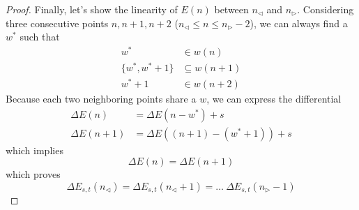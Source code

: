 \documentclass[]{article}
\begin{document}
\begin{proof}
	Finally, let's show the linearity of $E(n)$ between $n_{\triangleleft}$ and $n_{\triangleright}$. Considering three consecutive points $n, n+1, n+2$ ($n_{\triangleleft} \le n \le n_{\triangleright} - 2$), we can always find a $w^*$ such that
	\begin{align*}
	w^* &\in w(n)\\
	\{w^*, w^*+1\} &\subseteq w(n+1)\\
	w^*+1 &\in w(n+2)
	\end{align*}
	Because each two neighboring points share a $w$, we can express the differential
	\begin{align*}
	\Delta E(n) &= \Delta E(n - w^*) + s\\
	\Delta E(n+1) &= \Delta E((n+1) - (w^*+1)) + s
	\end{align*}
	which implies
	\[
	\Delta E(n) = \Delta E(n+1)
	\]
	which proves 
	\[
	\Delta E_{s,t}(n_{\triangleleft}) = \Delta E_{s,t}(n_{\triangleleft} + 1) = \dots \ \Delta E_{s,t}(n_{\triangleright} - 1)
	\]
		
\end{proof}
\end{document}
